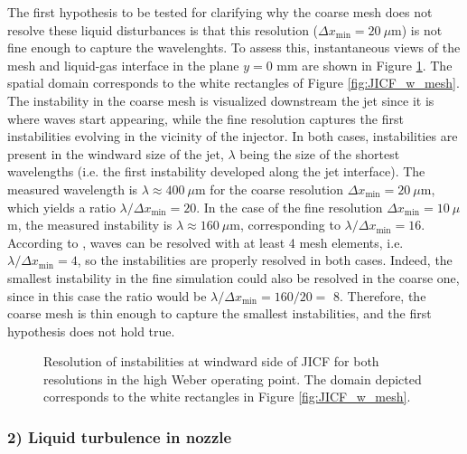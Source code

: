 The first hypothesis to be tested for clarifying why the coarse mesh does not resolve these liquid disturbances is that this resolution ($\Delta x_\mathrm{min} = 20~\mu$m) is not fine enough to capture the wavelenghts. To assess this, instantaneous views of the mesh and liquid-gas interface in the plane $y = 0$ mm are shown in Figure \ref{fig:JICF_instabilities_lambda}. The spatial domain corresponds to the white rectangles of Figure \ref{fig:JICF_w_mesh}. The instability in the coarse mesh is visualized downstream the jet since it is where waves start appearing, while the fine resolution captures the first instabilities evolving in the vicinity of the injector. In both cases, instabilities are present in the windward size of the jet, $\lambda$ being the size of the shortest wavelengths (i.e. the first instability developed along the jet interface). The measured wavelength is $\lambda \approx 400 ~ \mu$m for the coarse resolution $\Delta x_\mathrm{min} = 20~\mu$m, which yields a ratio $\lambda / \Delta x_\mathrm{min} = 20$. In the case of the fine resolution $\Delta x_\mathrm{min} = 10~\mu$m, the measured instability is $\lambda \approx 160 ~ \mu$m, corresponding to $\lambda / \Delta x_\mathrm{min} = 16$.  According to , waves can be resolved with at least 4 mesh elements, i.e.  $\lambda / \Delta x_\mathrm{min} = 4$, so the instabilities are properly resolved in both cases. Indeed, the smallest instability in the fine simulation could also be resolved in the coarse one, since in this case the ratio would be $\lambda / \Delta x_\mathrm{min} = 160/20 = $ 8. Therefore, the coarse mesh is thin enough to capture the smallest instabilities, and the first hypothesis does not hold true.

\clearpage

\begin{figure}[ht]
\centering
{}
\caption[Resolution of instabilities at windward side of JICF for both resolutions in the high Weber operating point.]{Resolution of instabilities at windward side of JICF for both resolutions in the high Weber operating point. The domain depicted corresponds to the white rectangles in Figure \ref{fig:JICF_w_mesh}. }
\label{fig:JICF_instabilities_lambda}
\end{figure}



\subsubsection*{2) Liquid turbulence in nozzle}

